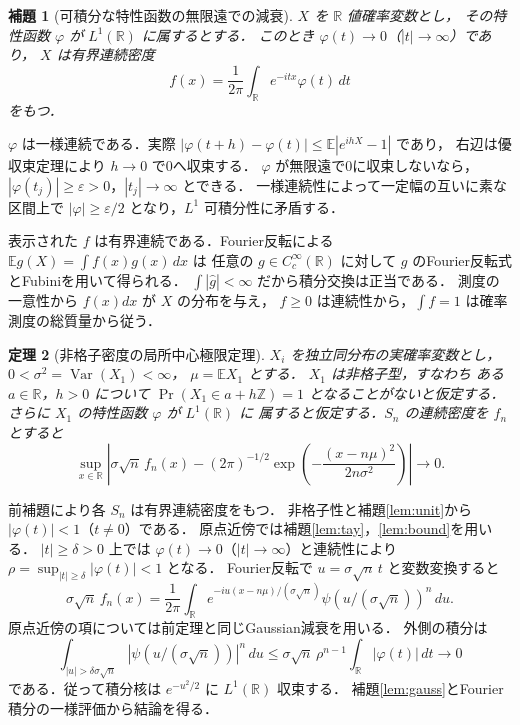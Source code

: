 \documentclass[a5paper,10pt,onecolumn]{jsarticle}
\makeatletter
\theoremstyle{mathnotetheorem}
\newtheorem{theorem}{定理}[section]
\newtheorem{lemma}[theorem]{補題}
\renewcommand{\proofname}{証明}
\renewenvironment{proof}[1][\proofname]{%
  \par\pushQED{\qed}\normalfont\topsep4\p@\@plus2\p@\relax
  \trivlist\item[\hskip\labelsep\bfseries #1]\ignorespaces
}{\popQED\endtrivlist\@endpefalse}
\makeatother
\begin{document}
\begin{lemma}[可積分な特性函数の無限遠での減衰]\label{lem:decay}
$X$ を $\mathbb R$ 値確率変数とし，
その特性函数 $\varphi$ が $L^1(\mathbb R)$ に属するとする．
このとき $\varphi(t)\to0$（$|t|\to\infty$）であり，
$X$ は有界連続密度
\[
 f(x)=\frac1{2\pi}\int_{\mathbb R}e^{-itx}\varphi(t)\,dt
\]
をもつ．
\end{lemma}
\begin{proof}
$\varphi$ は一様連続である．実際
$|\varphi(t+h)-\varphi(t)|\le\mathbb E|e^{ihX}-1|$ であり，
右辺は優収束定理により $h\to0$ で0へ収束する．
$\varphi$ が無限遠で0に収束しないなら，
$|\varphi(t_j)|\ge\varepsilon>0$，$|t_j|\to\infty$ とできる．
一様連続性によって一定幅の互いに素な区間上で
$|\varphi|\ge\varepsilon/2$ となり，$L^1$ 可積分性に矛盾する．

表示された $f$ は有界連続である．Fourier反転による
$\mathbb E g(X)=\int f(x)g(x)\,dx$ は
任意の $g\in C_c^\infty(\mathbb R)$ に対して
$g$ のFourier反転式とFubiniを用いて得られる．
$\int|\widehat g|<\infty$ だから積分交換は正当である．
測度の一意性から $f(x)dx$ が $X$ の分布を与え，
$f\ge0$ は連続性から，$\int f=1$ は確率測度の総質量から従う．
\end{proof}

\begin{theorem}[非格子密度の局所中心極限定理]\label{thm:density}
$X_i$ を独立同分布の実確率変数とし，
$0<\sigma^2=\operatorname{Var}(X_1)<\infty$，
$\mu=\mathbb EX_1$ とする．
$X_1$ は非格子型，すなわち
ある $a\in\mathbb R$，$h>0$ について
$\Pr(X_1\in a+h\mathbb Z)=1$ となることがないと仮定する．
さらに $X_1$ の特性函数 $\varphi$ が $L^1(\mathbb R)$ に
属すると仮定する．$S_n$ の連続密度を $f_n$ とすると
\[
 \sup_{x\in\mathbb R}\left|
 \sigma\sqrt n\,f_n(x)
 -(2\pi)^{-1/2}\exp\!\left(-\frac{(x-n\mu)^2}{2n\sigma^2}\right)
 \right|\longrightarrow0.
\]
\end{theorem}
\begin{proof}
前補題により各 $S_n$ は有界連続密度をもつ．
非格子性と補題\ref{lem:unit}から
$|\varphi(t)|<1$（$t\ne0$）である．
原点近傍では補題\ref{lem:tay}，\ref{lem:bound}を用いる．
$|t|\ge\delta>0$ 上では
$\varphi(t)\to0$（$|t|\to\infty$）と連続性により
$\rho=\sup_{|t|\ge\delta}|\varphi(t)|<1$ となる．
Fourier反転で $u=\sigma\sqrt n\,t$ と変数変換すると
\[
 \sigma\sqrt n\,f_n(x)
 =\frac1{2\pi}\int_{\mathbb R}
     e^{-iu(x-n\mu)/(\sigma\sqrt n)}
     \psi(u/(\sigma\sqrt n))^n\,du.
\]
原点近傍の項については前定理と同じGaussian減衰を用いる．
外側の積分は
\[
 \int_{|u|>\delta\sigma\sqrt n}
  |\psi(u/(\sigma\sqrt n))|^n\,du
 \le\sigma\sqrt n\,\rho^{n-1}
                      \int_{\mathbb R}|\varphi(t)|\,dt\to0
\]
である．従って積分核は
$e^{-u^2/2}$ に $L^1(\mathbb R)$ 収束する．
補題\ref{lem:gauss}とFourier積分の一様評価から結論を得る．
\end{proof}
\end{document}
